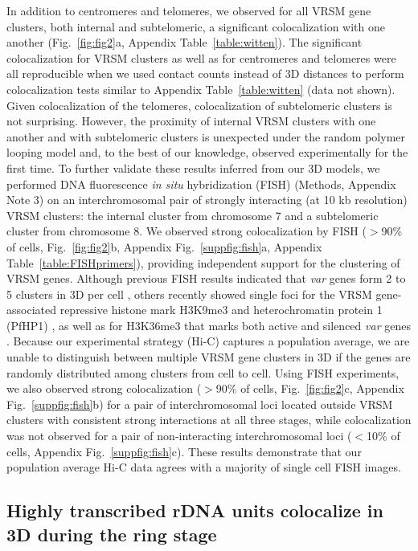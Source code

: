 In addition to centromeres and telomeres, we observed for all VRSM gene
clusters, both internal and subtelomeric, a significant colocalization with
one another (Fig.~\ref{fig:fig2}a, Appendix Table~\ref{table:witten}).
The significant colocalization for VRSM clusters as well as for centromeres
and telomeres were all reproducible when we used contact counts instead of 3D
distances to perform colocalization tests similar to Appendix
Table~\ref{table:witten} (data not shown). Given colocalization of the
telomeres, colocalization of subtelomeric clusters is not surprising. However,
the proximity of internal VRSM clusters with one another and with subtelomeric
clusters is unexpected under the random polymer looping model and, to the best
of our knowledge, observed experimentally for the first time. To further
validate these results inferred from our 3D models, we performed DNA
fluorescence {\em in situ} hybridization (FISH) (Methods, Appendix Note
3) on an interchromosomal pair of strongly interacting (at 10 kb resolution)
VRSM clusters: the internal cluster from chromosome 7 and a subtelomeric
cluster from chromosome 8. We observed strong colocalization by FISH ($>$90\%
of cells, Fig.~\ref{fig:fig2}b, Appendix Fig.~\ref{suppfig:fish}a,
Appendix Table~\ref{table:FISHprimers}), providing independent support
for the clustering of VRSM genes. Although previous FISH results indicated
that {\em var} genes form 2 to 5 clusters in 3D per cell
\citep{freitas-junior:frequent, lopez-rubio:genome-wide}, others recently
showed single foci for the VRSM gene-associated repressive histone mark
H3K9me3 and heterochromatin protein 1 (PfHP1) \citep{dahan:pfsec13}, as well
as for H3K36me3 that marks both active and silenced {\em var} genes
\citep{ukaegbu:recruitment}. Because our experimental strategy (Hi-C) captures
a population average, we are unable to distinguish between multiple VRSM gene
clusters in 3D if the genes are randomly distributed among clusters from cell
to cell. Using FISH experiments, we also observed strong colocalization
($>$90\% of cells, Fig.~\ref{fig:fig2}c, Appendix
Fig.~\ref{suppfig:fish}b) for a pair of interchromosomal loci located outside
VRSM clusters with consistent strong interactions at all three stages, while
colocalization was not observed for a pair of non-interacting interchromosomal
loci ($<$10\% of cells, Appendix Fig.~\ref{suppfig:fish}c). These
results demonstrate that our population average Hi-C data agrees with a
majority of single cell FISH images.

\subsection{Highly transcribed rDNA units colocalize in 3D during the ring stage}

